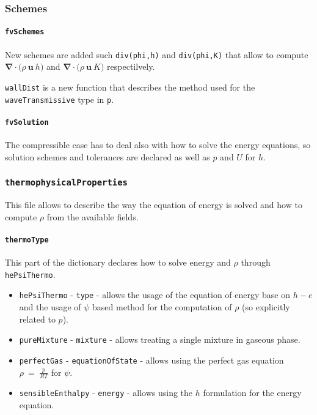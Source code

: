 \subsubsection{Schemes}
\cprotect\paragraph{\verb|fvSchemes|}
New schemes are added such \verb|div(phi,h)| and \verb|div(phi,K)| that allow to compute $\boldsymbol{\nabla} \cdot \big( \rho \ \boldsymbol{u} \ h \big)$ and $\boldsymbol{\nabla} \cdot \big( \rho \ \boldsymbol{u} \ K \big)$ respectilvely.

\verb|wallDist| is a new function that describes the method used for the \verb|waveTransmissive| type in \verb|p|.

\cprotect\paragraph{\verb|fvSolution|}
The compressible case has to deal also with how to solve the energy equations, so solution schemes and tolerances are declared as well as $p$ and $U$ for $h$.

\cprotect\subsubsection{\verb|thermophysicalProperties|}
This file allows to describe the way the equation of energy is solved and how to compute $\rho$ from the available fields. 
\cprotect\paragraph{\verb|thermoType|}
This part of the dictionary declares how to solve energy and $\rho$ through \verb|hePsiThermo|.
\begin{itemize}
    \item \verb|hePsiThermo| - \verb|type| - allows the usage of the equation of energy base on $h - e$ and the usage of $\psi$ based method for the computation of $\rho$ (so explicitly related to $p$). 
    \item \verb|pureMixture| - \verb|mixture| - allows treating a single mixture in gaseous phase.
    \item \verb|perfectGas| - \verb|equationOfState| - allows using the perfect gas equation $\rho~=~\frac{p}{R T}$ for $\psi$.
    \item \verb|sensibleEnthalpy| - \verb|energy| - allows using the $h$ formulation for the energy equation.
\end{itemize}

